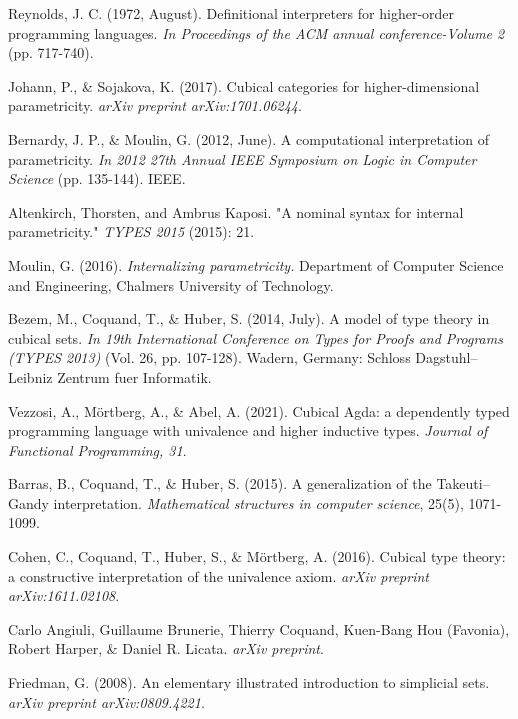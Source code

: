 \documentclass[10pt]{art.cls/art}
\begin{document}
\newpage
\begin{thebibliography}{10}
  Reynolds, J. C. (1972, August). Definitional interpreters for higher-order programming languages. \emph{In Proceedings of the ACM annual conference-Volume 2} (pp. 717-740).

  Johann, P., \& Sojakova, K. (2017). Cubical categories for higher-dimensional parametricity. \emph{arXiv preprint arXiv:1701.06244}.

  Bernardy, J. P., \& Moulin, G. (2012, June). A computational interpretation of parametricity. \emph{In 2012 27th Annual IEEE Symposium on Logic in Computer Science} (pp. 135-144). IEEE.

  Altenkirch, Thorsten, and Ambrus Kaposi. "A nominal syntax for internal parametricity." \emph{TYPES 2015} (2015): 21.

  Moulin, G. (2016). \emph{Internalizing parametricity.} Department of Computer Science and Engineering, Chalmers University of Technology.

  Bezem, M., Coquand, T., \& Huber, S. (2014, July). A model of type theory in cubical sets. \emph{In 19th International Conference on Types for Proofs and Programs (TYPES 2013)} (Vol. 26, pp. 107-128). Wadern, Germany: Schloss Dagstuhl–Leibniz Zentrum fuer Informatik.

  Vezzosi, A., Mörtberg, A., \& Abel, A. (2021). Cubical Agda: a dependently typed programming language with univalence and higher inductive types. \emph{Journal of Functional Programming, 31}.

  Barras, B., Coquand, T., \& Huber, S. (2015). A generalization of the Takeuti–Gandy interpretation. \emph{Mathematical structures in computer science}, 25(5), 1071-1099.

  Cohen, C., Coquand, T., Huber, S., \& Mörtberg, A. (2016). Cubical type theory: a constructive interpretation of the univalence axiom. \emph{arXiv preprint arXiv:1611.02108}.

  Carlo Angiuli, Guillaume Brunerie, Thierry Coquand, Kuen-Bang Hou (Favonia), Robert Harper, \& Daniel R. Licata. \emph{arXiv preprint}.

  Friedman, G. (2008). An elementary illustrated introduction to simplicial sets. \emph{arXiv preprint arXiv:0809.4221}.


\end{thebibliography}
\end{document}
